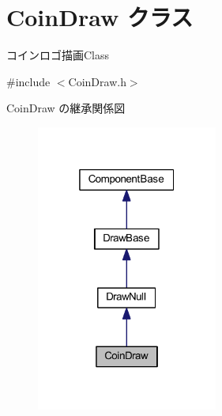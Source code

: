 \hypertarget{class_coin_draw}{}\section{Coin\+Draw クラス}
\label{class_coin_draw}


コインロゴ描画\+Class  




{\ttfamily \#include $<$Coin\+Draw.\+h$>$}



Coin\+Draw の継承関係図\nopagebreak
\begin{figure}[H]
\begin{center}
\leavevmode
\includegraphics[width=169pt]{class_coin_draw__inherit__graph}
\end{center}
\end{figure}

